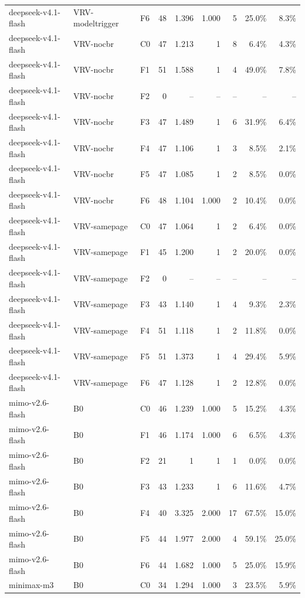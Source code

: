 \begin{tabular}{lllrrrrrr}
deepseek-v4.1-flash & VRV-modeltrigger & F6 & 48 & 1.396 & 1.000 & 5 & 25.0\% & 8.3\% \\
deepseek-v4.1-flash & VRV-nocbr & C0 & 47 & 1.213 & 1 & 8 & 6.4\% & 4.3\% \\
deepseek-v4.1-flash & VRV-nocbr & F1 & 51 & 1.588 & 1 & 4 & 49.0\% & 7.8\% \\
deepseek-v4.1-flash & VRV-nocbr & F2 & 0 & -- & -- & -- & -- & -- \\
deepseek-v4.1-flash & VRV-nocbr & F3 & 47 & 1.489 & 1 & 6 & 31.9\% & 6.4\% \\
deepseek-v4.1-flash & VRV-nocbr & F4 & 47 & 1.106 & 1 & 3 & 8.5\% & 2.1\% \\
deepseek-v4.1-flash & VRV-nocbr & F5 & 47 & 1.085 & 1 & 2 & 8.5\% & 0.0\% \\
deepseek-v4.1-flash & VRV-nocbr & F6 & 48 & 1.104 & 1.000 & 2 & 10.4\% & 0.0\% \\
deepseek-v4.1-flash & VRV-samepage & C0 & 47 & 1.064 & 1 & 2 & 6.4\% & 0.0\% \\
deepseek-v4.1-flash & VRV-samepage & F1 & 45 & 1.200 & 1 & 2 & 20.0\% & 0.0\% \\
deepseek-v4.1-flash & VRV-samepage & F2 & 0 & -- & -- & -- & -- & -- \\
deepseek-v4.1-flash & VRV-samepage & F3 & 43 & 1.140 & 1 & 4 & 9.3\% & 2.3\% \\
deepseek-v4.1-flash & VRV-samepage & F4 & 51 & 1.118 & 1 & 2 & 11.8\% & 0.0\% \\
deepseek-v4.1-flash & VRV-samepage & F5 & 51 & 1.373 & 1 & 4 & 29.4\% & 5.9\% \\
deepseek-v4.1-flash & VRV-samepage & F6 & 47 & 1.128 & 1 & 2 & 12.8\% & 0.0\% \\
mimo-v2.6-flash & B0 & C0 & 46 & 1.239 & 1.000 & 5 & 15.2\% & 4.3\% \\
mimo-v2.6-flash & B0 & F1 & 46 & 1.174 & 1.000 & 6 & 6.5\% & 4.3\% \\
mimo-v2.6-flash & B0 & F2 & 21 & 1 & 1 & 1 & 0.0\% & 0.0\% \\
mimo-v2.6-flash & B0 & F3 & 43 & 1.233 & 1 & 6 & 11.6\% & 4.7\% \\
mimo-v2.6-flash & B0 & F4 & 40 & 3.325 & 2.000 & 17 & 67.5\% & 15.0\% \\
mimo-v2.6-flash & B0 & F5 & 44 & 1.977 & 2.000 & 4 & 59.1\% & 25.0\% \\
mimo-v2.6-flash & B0 & F6 & 44 & 1.682 & 1.000 & 5 & 25.0\% & 15.9\% \\
minimax-m3 & B0 & C0 & 34 & 1.294 & 1.000 & 3 & 23.5\% & 5.9\% \\

\end{tabular}
